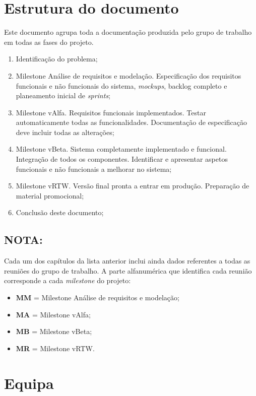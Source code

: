 \section{Estrutura do documento}
Este documento agrupa toda a documentação produzida pelo grupo de trabalho em todas as fases do projeto. \\

\begin{enumerate}
	\item Identificação do problema;
	\item Milestone Análise de requisitos e modelação. Especificação dos requisitos funcionais e não funcionais do sistema, \textit{mockups}, backlog completo e planeamento inicial de \textit{sprints};
	\item Milestone vAlfa. Requisitos funcionais implementados. Testar automaticamente todas as funcionalidades. Documentação de especificação deve incluir todas as alterações;
	\item Milestone vBeta. Sistema completamente implementado e funcional. Integração de todos os componentes. Identificar e apresentar aspetos funcionais e não funcionais a melhorar no sistema;
	\item Milestone vRTW. Versão final pronta a entrar em produção. Preparação de material promocional; 
	\item Conclusão deste documento;
\end{enumerate}

\subsection*{\textbf{NOTA}:}

Cada um dos capítulos da lista anterior inclui ainda dados referentes a todas as reuniões do grupo de trabalho. A parte alfanumérica que identifica cada reunião corresponde a cada \textit{milestone} do projeto:
\begin{itemize}
	\item \textbf{MM} = Milestone Análise de requisitos e modelação;
	\item \textbf{MA} = Milestone vAlfa;
	\item \textbf{MB} = Milestone vBeta;
	\item \textbf{MR} = Milestone vRTW. 
\end{itemize}


\section{Equipa}

